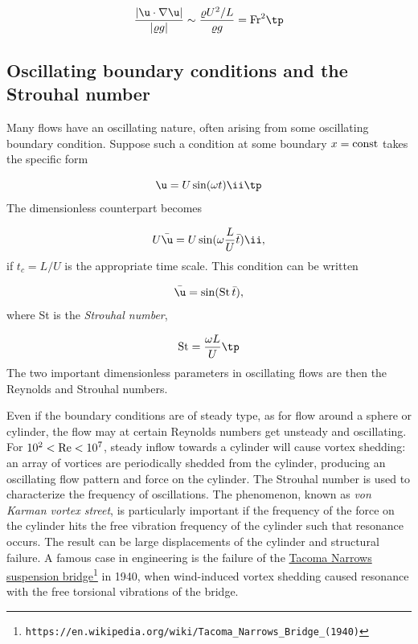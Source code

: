 \documentclass[graybox,envcountchap,sectrefs,final]{svmonodo}
\begin{document}
\[ \frac{|\u\cdot\nabla\u|}{|\varrho g|} \sim \frac{\varrho U^2/L}{\varrho g}
= \hbox{Fr}^2\tp\]


\subsection{Oscillating boundary conditions and the Strouhal number}


Many flows have an oscillating nature, often arising from some
oscillating boundary condition. Suppose such a condition at some
boundary $x=\hbox{const}$ takes the specific form

\[ \u = U\sin(\omega t)\ii\tp\]
The dimensionless counterpart becomes

\[ U\bar\u = U\sin(\omega \frac{L}{U}\bar t)\ii,\]
if $t_c=L/U$ is the appropriate time scale. This condition can be
written

\begin{equation}
\bar\u = \sin(\hbox{St}\,\bar t),
\end{equation}
where St is the \emph{Strouhal number},

\begin{equation}
\hbox{St} = \frac{\omega L}{U}\tp
\end{equation}
The two important dimensionless parameters in oscillating flows are
then the Reynolds and Strouhal numbers.


Even if the boundary conditions
are of steady type, as for flow around a sphere or cylinder,
the flow may at certain Reynolds numbers get unsteady and oscillating.
For $10^2 < \hbox{Re} < 10^7$, steady inflow towards a cylinder will
cause vortex shedding: an array of vortices are periodically shedded
from the cylinder, producing an oscillating flow pattern and force
on the cylinder. The Strouhal number is used to characterize the
frequency of oscillations. The phenomenon, known as \emph{von Karman
vortex street}, is particularly important if the frequency
of the force on the cylinder hits the free vibration frequency
of the cylinder such that resonance occurs. The result can be large
displacements of the cylinder and structural failure. A famous
case in engineering is the failure of the \href{{https://en.wikipedia.org/wiki/Tacoma_Narrows_Bridge_(1940)}}{Tacoma Narrows suspension
bridge}\footnote{\texttt{https://en.wikipedia.org/wiki/Tacoma\_Narrows\_Bridge\_(1940)}}
in 1940, when wind-induced vortex shedding caused resonance
with the free torsional vibrations of the bridge.
\end{document}
